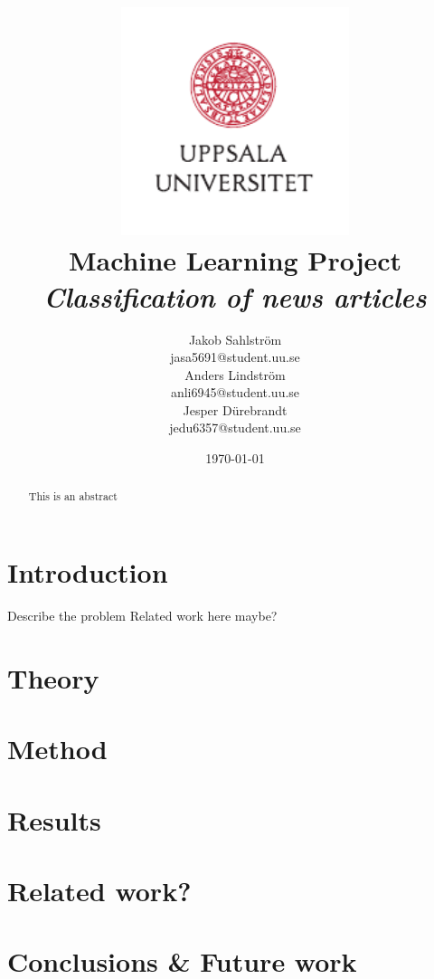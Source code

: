 \documentclass[11pt, a4paper]{article}
\title{
\includegraphics[width=0.5\textwidth]{../img/uu-logo.pdf}\\
Machine Learning Project\\ \Large \emph{Classification of news articles}}
\author{Jakob Sahlström \\ \scriptsize{jasa5691@student.uu.se} \\
Anders Lindström \\ \scriptsize{anli6945@student.uu.se} \\
Jesper Dürebrandt \\ \scriptsize{jedu6357@student.uu.se}}
\date{\today} %
\begin{document}
\maketitle
\thispagestyle{empty}
\newpage
\setcounter{page}{1}
\begin{abstract}
This is an abstract
\end{abstract}
\newpage
\tableofcontents
\newpage
\section{Introduction}
Describe the problem 
Related work here maybe?

\section{Theory}

\section{Method}

\section{Results}

\section{Related work?}

\section{Conclusions \& Future work}

\begin{thebibliography}{99}
\end{thebibliography}
\end{document}
